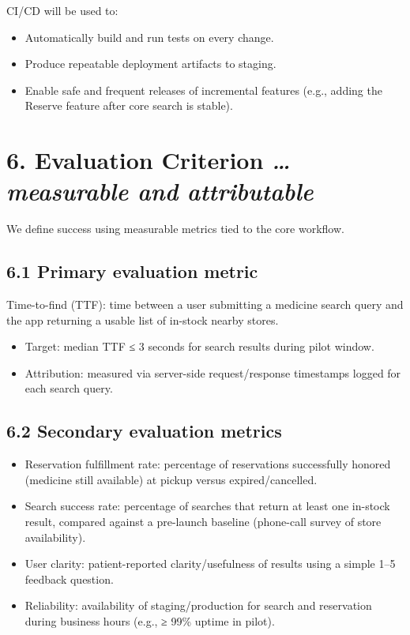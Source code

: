 \documentclass[
]{article}
\begin{document}
CI/CD will be used to:

\begin{itemize}
\item
  Automatically build and run tests on every change.
\item
  Produce repeatable deployment artifacts to staging.
\item
  Enable safe and frequent releases of incremental features (e.g.,
  adding the Reserve feature after core search is stable).
\end{itemize}

\section{\texorpdfstring{\textbf{6. Evaluation Criterion}
\emph{\ldots measurable and
attributable}}{6. Evaluation Criterion \ldots measurable and attributable}}\label{evaluation-criterion-measurable-and-attributable}

We define success using measurable metrics tied to the core workflow.

\subsection{\texorpdfstring{\textbf{6.1 Primary evaluation
metric}}{6.1 Primary evaluation metric}}\label{primary-evaluation-metric}

Time-to-find (TTF): time between a user submitting a medicine search
query and the app returning a usable list of in-stock nearby stores.

\begin{itemize}
\item
  Target: median TTF ≤ 3 seconds for search results during pilot window.
\item
  Attribution: measured via server-side request/response timestamps
  logged for each search query.
\end{itemize}

\subsection{\texorpdfstring{\textbf{6.2 Secondary evaluation
metrics}}{6.2 Secondary evaluation metrics}}\label{secondary-evaluation-metrics}

\begin{itemize}
\item
  Reservation fulfillment rate: percentage of reservations successfully
  honored (medicine still available) at pickup versus expired/cancelled.
\item
  Search success rate: percentage of searches that return at least one
  in-stock result, compared against a pre-launch baseline (phone-call
  survey of store availability).
\item
  User clarity: patient-reported clarity/usefulness of results using a
  simple 1--5 feedback question.
\item
  Reliability: availability of staging/production for search and
  reservation during business hours (e.g., ≥ 99\% uptime in pilot).
\end{itemize}
\end{document}

